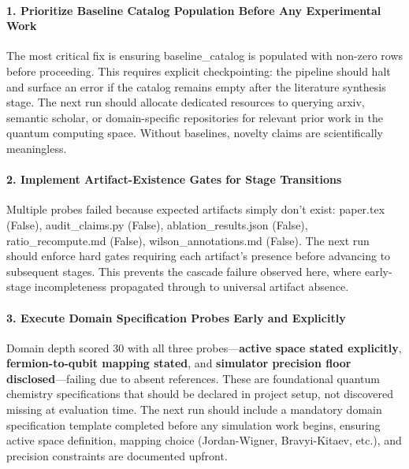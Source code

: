 \documentclass[10pt,letterpaper]{article}
\begin{document}
\hypertarget{prioritize-baseline-catalog-population-before-any-experimental-work}{%
\paragraph{1. Prioritize Baseline Catalog Population Before Any Experimental Work}\label{prioritize-baseline-catalog-population-before-any-experimental-work}}

The most critical fix is ensuring baseline\_catalog is populated with non-zero rows before proceeding. This requires explicit checkpointing: the pipeline should halt and surface an error if the catalog remains empty after the literature synthesis stage. The next run should allocate dedicated resources to querying arxiv, semantic scholar, or domain-specific repositories for relevant prior work in the quantum computing space. Without baselines, novelty claims are scientifically meaningless.

\hypertarget{implement-artifact-existence-gates-for-stage-transitions}{%
\paragraph{2. Implement Artifact-Existence Gates for Stage Transitions}\label{implement-artifact-existence-gates-for-stage-transitions}}

Multiple probes failed because expected artifacts simply don't exist: paper.tex (False), audit\_claims.py (False), ablation\_results.json (False), ratio\_recompute.md (False), wilson\_annotations.md (False). The next run should enforce hard gates requiring each artifact's presence before advancing to subsequent stages. This prevents the cascade failure observed here, where early-stage incompleteness propagated through to universal artifact absence.

\hypertarget{execute-domain-specification-probes-early-and-explicitly}{%
\paragraph{3. Execute Domain Specification Probes Early and Explicitly}\label{execute-domain-specification-probes-early-and-explicitly}}

Domain depth scored 30 with all three probes---\textbf{active space stated explicitly}, \textbf{fermion-to-qubit mapping stated}, and \textbf{simulator precision floor disclosed}---failing due to absent references. These are foundational quantum chemistry specifications that should be declared in project setup, not discovered missing at evaluation time. The next run should include a mandatory domain specification template completed before any simulation work begins, ensuring active space definition, mapping choice (Jordan-Wigner, Bravyi-Kitaev, etc.), and precision constraints are documented upfront.
\end{document}
